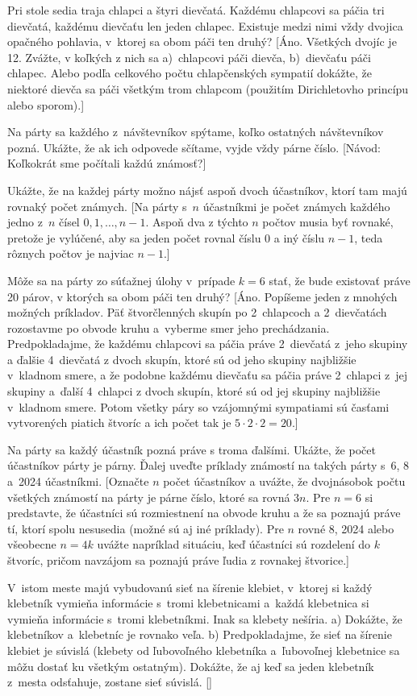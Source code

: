 {Pri stole sedia traja chlapci a štyri dievčatá. Každému chlapcovi sa páčia
tri dievčatá, každému dievčaťu len jeden chlapec. Existuje medzi nimi vždy dvojica
opačného pohlavia, v~ktorej sa obom páči ten druhý?
[Áno. Všetkých dvojíc je 12. Zvážte, v koľkých z nich sa a)~chlapcovi páči dievča, b)~dievčaťu
páči chlapec. Alebo podľa celkového počtu chlapčenských sympatií
dokážte, že niektoré dievča sa páči všetkým trom chlapcom
(použitím Dirichletovho princípu alebo sporom).]

Na párty sa každého z~návštevníkov spýtame, koľko
ostatných návštevníkov pozná. Ukážte, že ak ich odpovede
sčítame, vyjde vždy párne číslo.
[Návod: Koľkokrát sme počítali
každú známosť?]

Ukážte, že na každej párty možno nájsť aspoň dvoch účastníkov,
ktorí tam majú rovnaký počet známych.
[Na párty s~$n$ účastníkmi
je počet známych každého jedno z~$n$ čísel $0,1,\dots,n-1$.
Aspoň dva z týchto $n$ počtov musia byť rovnaké, pretože je vylúčené,
aby sa jeden počet rovnal číslu 0 a iný číslu $n-1$,
teda rôznych počtov je najviac $n-1$.]

\D
Môže sa na párty zo súťažnej úlohy v~prípade $k=6$ stať, že
bude existovať práve 20 párov, v ktorých sa obom páči ten druhý?
[Áno. Popíšeme jeden z mnohých možných príkladov.
Päť štvorčlenných skupín po 2~chlapcoch a 2~dievčatách
rozostavme po obvode kruhu a~vyberme  smer jeho
prechádzania. Predpokladajme, že každému chlapcovi sa
páčia práve 2~dievčatá z~jeho skupiny a ďalšie 4~dievčatá z dvoch skupín,
ktoré sú od jeho skupiny najbližšie v~kladnom smere, a že podobne
každému dievčaťu sa páčia práve 2~chlapci z~jej skupiny a~ďalší
4~chlapci z dvoch skupín, ktoré sú od jej skupiny najbližšie
v~kladnom smere. Potom všetky páry so vzájomnými sympatiami
sú časťami vytvorených piatich štvoríc a ich počet tak je
$5\cdot2\cdot2=20$.]

Na párty sa každý účastník pozná práve s troma ďalšími. Ukážte, že
počet účastníkov párty je párny. Ďalej uveďte príklady známostí na takých
párty s~6, 8 a~2024 účastníkmi.
[Označte $n$ počet
účastníkov a uvážte, že dvojnásobok počtu všetkých známostí
na párty je párne číslo, ktoré sa rovná $3n$.
Pre $n=6$ si predstavte, že
účastníci sú rozmiestnení na obvode kruhu a že sa poznajú práve tí,
ktorí spolu nesusedia (možné sú aj iné príklady).
Pre $n$ rovné 8, 2024 alebo všeobecne $n=4k$
uvážte napríklad situáciu, keď účastníci
sú rozdelení do $k$ štvoríc,
pričom navzájom sa poznajú práve ľudia z rovnakej štvorice.]

V~istom meste majú vybudovanú sieť na šírenie klebiet, v~ktorej si
každý klebetník vymieňa informácie s~tromi klebetnicami a~každá
klebetnica si vymieňa informácie s~tromi klebetníkmi.
Inak sa klebety nešíria.
 a) Dokážte, že klebetníkov a~klebetníc je rovnako veľa.
 b) Predpokladajme, že sieť na šírenie klebiet je súvislá (klebety od
ľubovoľného klebetníka a~ľubovoľnej klebetnice sa môžu dostať ku všetkým
ostatným). Dokážte, že aj keď sa jeden klebetník z~mesta odsťahuje, zostane sieť
súvislá. []

}
